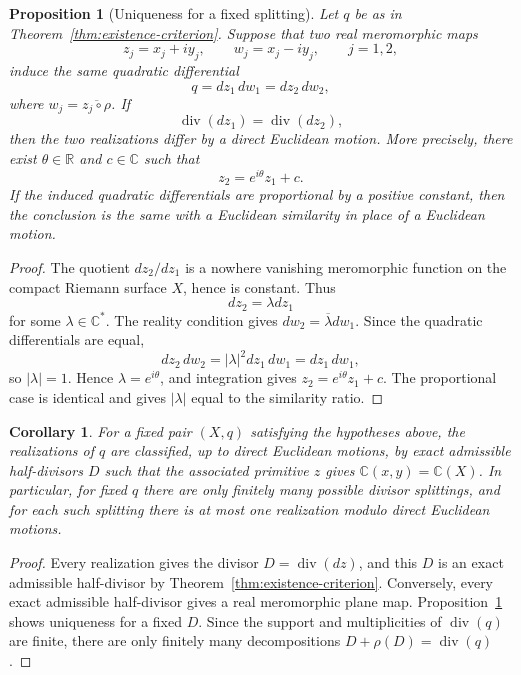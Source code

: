 \documentclass[reqno]{amsart}
\newtheorem{proposition}[theorem]{Proposition}
\newtheorem{corollary}{Corollary}
\newcommand{\bC}{\mathbb{C}}
\theoremstyle{definition}
\theoremstyle{remark}
\theoremstyle{definition}
\theoremstyle{definition}
\theoremstyle{definition}
\begin{document}
\begin{proposition}[Uniqueness for a fixed splitting]\label{prop:unique-fixed-splitting}
Let $q$ be as in Theorem~\ref{thm:existence-criterion}. Suppose that two real
meromorphic maps
\[
   z_j=x_j+i y_j,\qquad w_j=x_j-i y_j,\qquad j=1,2,
\]
induce the same quadratic differential
\[
   q=dz_1\,dw_1=dz_2\,dw_2,
\]
where $w_j=\overline{z_j\circ\rho}$.  If
\[
   \operatorname{div}(dz_1)=\operatorname{div}(dz_2),
\]
then the two realizations differ by a direct Euclidean motion.  More precisely,
there exist $\theta\in\mathbb R$ and $c\in\mathbb C$ such that
\[
   z_2=e^{i\theta}z_1+c.
\]
If the induced quadratic differentials are proportional by a positive
constant, then the conclusion is the same with a Euclidean similarity in place
of a Euclidean motion.
\end{proposition}

\begin{proof}
The quotient $dz_2/dz_1$ is a nowhere vanishing meromorphic function on the
compact Riemann surface $X$, hence is constant.  Thus
\[
   dz_2=\lambda dz_1
\]
for some $\lambda\in\mathbb C^*$.  The reality condition gives
$dw_2=\overline\lambda dw_1$.  Since the quadratic differentials are equal,
\[
   dz_2\,dw_2=|\lambda|^2 dz_1\,dw_1=dz_1\,dw_1,
\]
so $|\lambda|=1$.  Hence $\lambda=e^{i\theta}$, and integration gives
$z_2=e^{i\theta}z_1+c$.  The proportional case is identical and gives
$|\lambda|$ equal to the similarity ratio.
\end{proof}

\begin{corollary}\label{cor:finite-realizations-fixed-q}
For a fixed pair $(X,q)$ satisfying the hypotheses above, the realizations of
$q$ are classified, up to direct Euclidean motions, by exact admissible
half-divisors $D$ such that the associated primitive $z$ gives
$\bC(x,y)=\bC(X)$.  In particular, for fixed $q$ there are only finitely many
possible divisor splittings, and for each such splitting there is at most one
realization modulo direct Euclidean motions.
\end{corollary}

\begin{proof}
Every realization gives the divisor $D=\operatorname{div}(dz)$, and this
$D$ is an exact admissible half-divisor by Theorem~\ref{thm:existence-criterion}.
Conversely, every exact admissible half-divisor gives a real meromorphic plane
map.  Proposition~\ref{prop:unique-fixed-splitting} shows uniqueness for a
fixed $D$.  Since the support and multiplicities of $\operatorname{div}(q)$ are
finite, there are only finitely many decompositions
$D+\rho(D)=\operatorname{div}(q)$.
\end{proof}
\end{document}
